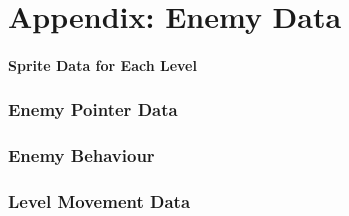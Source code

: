 \chapter{Appendix: Enemy Data}
\subsubsection{Sprite Data for Each Level}


\subsection{Enemy Pointer Data}


\subsection{Enemy Behaviour}


\subsection{Level Movement Data}

